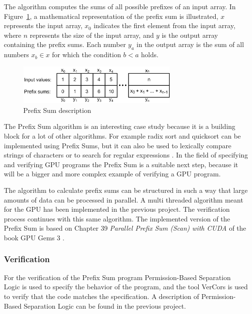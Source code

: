 \documentclass[a4paper]{article}
\begin{document}
The algorithm computes the sums of all possible prefixes of an input array. In Figure~\ref{prefixsumexample}, a mathematical representation of the prefix sum is illustrated, $x$ represents the input array, $x_0$ indicates the first element from the input array, where $n$ represents the size of the input array, and $y$ is the output array containing the prefix sums. Each number $y_a$ in the output array is the sum of all numbers $x_b \in x$ for which the condition $b<a$ holds.

\begin{figure}[htb!]
	\centering
	\includegraphics[width=80mm]{../images/prefix-sum-v1.png}
	\caption{Prefix Sum description}
	\label{prefixsumexample}
\end{figure}

The Prefix Sum algorithm is an interesting case study because it is a building block for a lot of other algorithms. For example radix sort and quicksort can be implemented using Prefix Sums, but it can also be used to lexically compare strings of characters or to search for regular expressions \cite{Blelloch:PrefixSumApplications}. In the field of specifying and verifying GPU programs the Prefix Sum is a suitable next step, because it will be a bigger and more complex example of verifying a GPU program.

The algorithm to calculate prefix sums can be structured in such a way that large amounts of data can be processed in parallel. A multi threaded algorithm meant for the GPU has been implemented in the previous project. The verification process continues with this same algorithm. The implemented version of the Prefix Sum is based on Chapter 39 \emph{Parallel Prefix Sum (Scan) with CUDA} of the book GPU Gems 3 \cite{Nguyen:GPUGems3}.

\subsubsection{Verification}
For the verification of the Prefix Sum program Permission-Based Separation Logic is used to specify the behavior of the program, and the tool VerCors is used to verify that the code matches the specification. A description of Permission-Based Separation Logic can be found in the previous project\cite{bachelorThesis}. 
\end{document}
